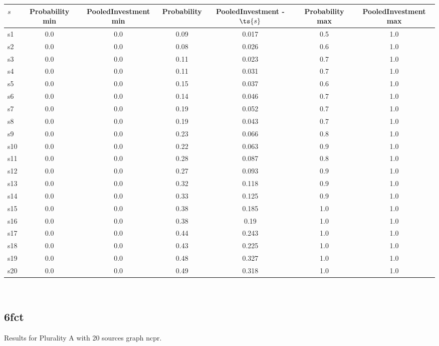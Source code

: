 \documentclass{article}
\begin{document}
\noindent\begin{tabular}{|l|c|c|c|c|c|c|}
\hline
$s$& Probability min & PooledInvestment min & Probability & PooledInvestment - $\ts{s}$ & Probability max & PooledInvestment max\\
\hline
s1 &0.0 & 0.0 & 0.09 & 0.017 & 0.5 & 1.0\\
\hline
s2 &0.0 & 0.0 & 0.08 & 0.026 & 0.6 & 1.0\\
\hline
s3 &0.0 & 0.0 & 0.11 & 0.023 & 0.7 & 1.0\\
\hline
s4 &0.0 & 0.0 & 0.11 & 0.031 & 0.7 & 1.0\\
\hline
s5 &0.0 & 0.0 & 0.15 & 0.037 & 0.6 & 1.0\\
\hline
s6 &0.0 & 0.0 & 0.14 & 0.046 & 0.7 & 1.0\\
\hline
s7 &0.0 & 0.0 & 0.19 & 0.052 & 0.7 & 1.0\\
\hline
s8 &0.0 & 0.0 & 0.19 & 0.043 & 0.7 & 1.0\\
\hline
s9 &0.0 & 0.0 & 0.23 & 0.066 & 0.8 & 1.0\\
\hline
s10 &0.0 & 0.0 & 0.22 & 0.063 & 0.9 & 1.0\\
\hline
s11 &0.0 & 0.0 & 0.28 & 0.087 & 0.8 & 1.0\\
\hline
s12 &0.0 & 0.0 & 0.27 & 0.093 & 0.9 & 1.0\\
\hline
s13 &0.0 & 0.0 & 0.32 & 0.118 & 0.9 & 1.0\\
\hline
s14 &0.0 & 0.0 & 0.33 & 0.125 & 0.9 & 1.0\\
\hline
s15 &0.0 & 0.0 & 0.38 & 0.185 & 1.0 & 1.0\\
\hline
s16 &0.0 & 0.0 & 0.38 & 0.19 & 1.0 & 1.0\\
\hline
s17 &0.0 & 0.0 & 0.44 & 0.243 & 1.0 & 1.0\\
\hline
s18 &0.0 & 0.0 & 0.43 & 0.225 & 1.0 & 1.0\\
\hline
s19 &0.0 & 0.0 & 0.48 & 0.327 & 1.0 & 1.0\\
\hline
s20 &0.0 & 0.0 & 0.49 & 0.318 & 1.0 & 1.0\\
\hline
\end{tabular}\\

\newpage

\subsection{6fct}

\noindent Results for Plurality A with 20 sources graph ncpr.
\end{document}
